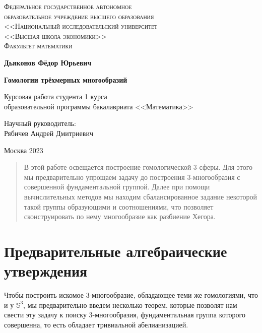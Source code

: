 \documentclass[a4paper, 12pt]{article}
\begin{document}

\begin{center}
{\scshape Федеральное государственное автономное\\
образовательное учреждение высшего образования\\
<<Национальный исследовательский университет\\
<<Высшая школа экономики>>\\[1ex]
Факультет математики\par}

\par\vfill

\textbf{\large Дьяконов Фёдор Юрьевич}

\vspace{1.5cm}

{\Large\bfseries
Гомологии трёхмерных многообразий
\par}

\vspace{1.5cm}

Курсовая работа студента 1 курса\\[1ex]
образовательной программы бакалавриата <<Математика>>
\par\vfill
\noindent\hspace{0.52\textwidth}\parbox[t]{0.48\textwidth}{%
Научный руководитель:\\[3pt]
Рябичев Андрей Дмитриевич\\[2ex]
}%
\par\vfill
Москва 2023
\end{center}
\thispagestyle{empty}

\pagebreak

\begin{abstract}
    В этой работе освещается построение гомологической 3-сферы. Для этого мы предварительно упрощаем задачу до построения 3-многообразия с совершенной фундаментальной группой. Далее при помощи вычислительных методов мы находим сбалансированное задание некоторой такой группы образующими и соотношениями, что позволяет сконструировать по нему многообразие как разбиение Хегора.
\end{abstract}


\section{Предварительные алгебраические утверждения}

    Чтобы построить искомое 3-многообразие, обладающее теми же гомологиями, что и у $\mathbb{S}^3$, мы предварительно введем несколько теорем, которые позволят нам свести эту задачу к поиску 3-многообразия, фундаментальная группа которого совершенна, то есть обладает тривиальной абелианизацией.
\end{document}
